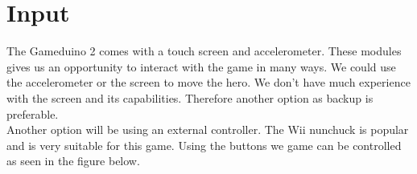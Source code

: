 

\section{Input}
The Gameduino 2 comes with a touch screen and accelerometer. These modules gives us an opportunity to interact with the game in many ways. We could use the accelerometer or the screen to move the hero. We don’t have much experience with the screen and its capabilities. Therefore another option as backup is preferable.\\
Another option will be using an external controller. The Wii nunchuck is popular and is very suitable for this game.  Using the buttons we game can be controlled as seen in the figure below.

